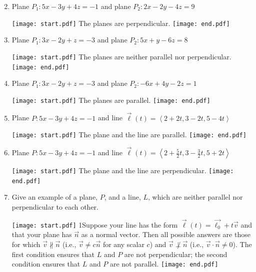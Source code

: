 \documentclass[12pt]{article}
\begin{document}

\begin{enumerate}
\setcounter{enumi}{1}

\item Plane $P_1:5x-3y+4z=-1$ and plane $P_2: 2x-2y-4z=9$

\texttt{[image: start.pdf]}
{{The planes are perpendicular.}}
\texttt{[image: end.pdf]}


\item Plane $P_1: 3x-2y+z=-3$ and plane $P_2: 5x+y-6z=8$

\texttt{[image: start.pdf]}
{{The planes are neither parallel nor perpendicular.}}
\texttt{[image: end.pdf]}


\item Plane $P_1: 3x-2y+z=-3$ and plane $P_2: -6x+4y-2z=1$

\texttt{[image: start.pdf]}
{{The planes are parallel.}}
\texttt{[image: end.pdf]}


\item Plane $P:5x-3y+4z=-1$ and line $\overrightarrow{\ell}(t)=\left\langle2+2t, 3-2t, 5-4t\right\rangle$

\texttt{[image: start.pdf]}
{{The plane and the line are parallel.}}
\texttt{[image: end.pdf]}


\item Plane $P:5x-3y+4z=-1$ and line $\overrightarrow{\ell}(t)=\left\langle2+\frac{5}{2}t, 3-\frac{3}{2}t, 5+2t\right\rangle$

\texttt{[image: start.pdf]}
{{The plane and the line are perpendicular.}}
\texttt{[image: end.pdf]}


\item Give an example of a plane, $P$, and a line, $L$, which are neither parallel nor perpendicular to each other.

\texttt{[image: start.pdf]}
{{{1\linewidth}{Suppose your line has the form $\overrightarrow{\ell}(t)=\overrightarrow{\ell_0}+t\overrightarrow{v}$ and that your plane has $\overrightarrow{n}$ as a normal vector.  Then all possible answers are those for which $\overrightarrow{v} \not\parallel \overrightarrow{n}$ (i.e., $\overrightarrow{v}\neq c\overrightarrow{n}$ for any scalar $c$) and $\overrightarrow{v} \not\perp \overrightarrow{n}$ (i.e., $\overrightarrow{v}\cdot\overrightarrow{n}\neq 0$).  The first condition ensures that $L$ and $P$ are not perpendicular; the second condition ensures that $L$ and $P$ are not parallel.}}}
\texttt{[image: end.pdf]}


\end{enumerate}
\end{document}
